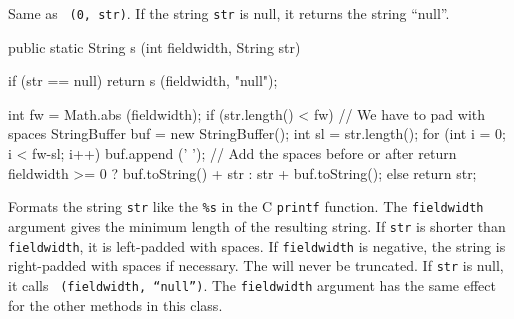 \begin{tabb}
   Same as ~\texttt{(0, str)}. If the string \texttt{str} is null,
   it returns the string ``null''.
\end{tabb}
\begin{htmlonly}
\end{htmlonly}
\begin{code}

   public static String s (int fieldwidth, String str)\begin{hide} {
      if (str == null)
         return s (fieldwidth, "null");

      int fw = Math.abs (fieldwidth);
      if (str.length() < fw) {
         // We have to pad with spaces
         StringBuffer buf = new StringBuffer();
         int sl = str.length();
         for (int i = 0; i < fw-sl; i++)
            buf.append (' ');
         // Add the spaces before or after
         return fieldwidth >= 0 ? buf.toString() + str
                     : str + buf.toString();
      }
      else
         return str;
   }\end{hide}
\end{code}
\begin{tabb} Formats the string \texttt{str} like the \texttt{\%s} in the C \texttt{printf}
 function. The \texttt{fieldwidth} argument gives the minimum length of the
 resulting string.  If \texttt{str} is shorter than \texttt{fieldwidth}, it is
left-padded with spaces.  If \texttt{fieldwidth} is negative, the string
is right-padded with spaces if necessary.  The  will never
be truncated. If \texttt{str} is null, it calls
~\texttt{(fieldwidth, ``null'')}.
%
The \texttt{fieldwidth} argument
has the same effect for the other methods in this class.
\end{tabb}
\begin{htmlonly}
\end{htmlonly}

